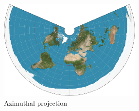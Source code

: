 \begin{figure}[!htb]
\centering
\includegraphics[height=5cm,keepaspectratio]{images/methods/projections/equidistant.jpg}
\caption[
    Azimuthal projection, Urldate: 07.2016 \newline
    \small\texttt{\url{https://upload.wikimedia.org/wikipedia/commons/e/ec/Azimuthal_equidistant_projection_SW.jpg}}.
]{Azimuthal projection}
\label{fig:projections-azimuthal}
\end{figure}
